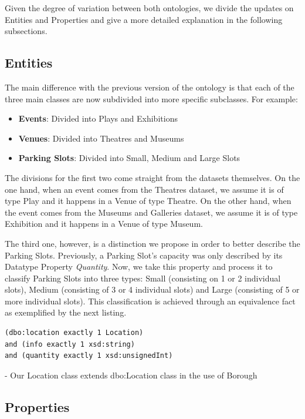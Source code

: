 \documentclass[runningheads,a4paper]{../../StyleFiles/llncs}
\begin{document}
Given the degree of variation between both ontologies, we divide the updates on Entities and Properties and give a more detailed explanation in the following subsections.

\subsection{Entities}
The main difference with the previous version of the ontology is that each of the three main classes are now subdivided into more specific subclasses. For example:

\begin{itemize}
	\item \textbf{Events}: Divided into Plays and Exhibitions
	\item \textbf{Venues}: Divided into Theatres and Museums
	\item \textbf{Parking Slots}: Divided into Small, Medium and Large Slots
\end{itemize}

The divisions for the first two come straight from the datasets themselves. On the one hand, when an event comes from the Theatres dataset, we assume it is of type Play and it happens in a Venue of type Theatre. On the other hand, when the event comes from the Museums and Galleries dataset, we assume it is of type Exhibition and it happens in a Venue of type Museum.

The third one, however, is a distinction we propose in order to better describe the Parking Slots. Previously, a Parking Slot's capacity was only described by its Datatype Property \textit{Quantity}. Now, we take this property and process it to classify Parking Slots into three types: Small (consisting on 1 or 2 individual slots), Medium (consisting of 3 or 4 individual slots) and Large (consisting of 5 or more individual slots). This classification is achieved through an equivalence fact as exemplified by the next listing. \\

\begin{lstlisting}[captionpos=b, caption=Definition of Large Slot a subclass of Parking Slot, label=lst:owl, basicstyle=\ttfamily\small,frame=bt]
(dbo:location exactly 1 Location)
and (info exactly 1 xsd:string)
and (quantity exactly 1 xsd:unsignedInt)
\end{lstlisting}

- Our Location class extends dbo:Location class in the use of Borough

\subsection{Properties}
\end{document}
